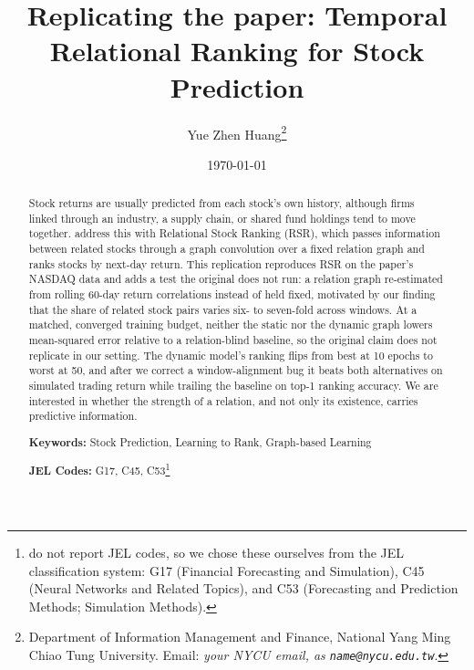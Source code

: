\documentclass[12pt]{article}
\newcommand{\inst}[1]{\textit{#1}}
\begin{document}
\begin{titlepage}

\title{Replicating the paper:
       Temporal Relational Ranking for Stock Prediction \citep{feng2019temporal}}

\author{Yue Zhen Huang\thanks{Department of Information Management and Finance,
        National Yang Ming Chiao Tung University. Email:
        \inst{your NYCU email, as \texttt{name@nycu.edu.tw}}.}}

\date{\today}
\maketitle

\begin{abstract}
\noindent
Stock returns are usually predicted from each stock's own history, although firms linked
through an industry, a supply chain, or shared fund holdings tend to move together.
\citet{feng2019temporal} address this with Relational Stock Ranking (RSR), which passes
information between related stocks through a graph convolution over a fixed relation graph and
ranks stocks by next-day return. This replication reproduces RSR on the paper's NASDAQ data and
adds a test the original does not run: a relation graph re-estimated from rolling 60-day return
correlations instead of held fixed, motivated by our finding that the share of related stock
pairs varies six- to seven-fold across windows. At a matched, converged training budget, neither
the static nor the dynamic graph lowers mean-squared error relative to a relation-blind baseline,
so the original claim does not replicate in our setting. The dynamic model's ranking flips from
best at 10 epochs to worst at 50, and after we correct a window-alignment bug it beats both
alternatives on simulated trading return while trailing the baseline on top-1 ranking accuracy.
We are interested in whether the strength of a relation, and not only its existence, carries
predictive information.

\vspace{0in}
\noindent\textbf{Keywords:} Stock Prediction, Learning to Rank, Graph-based Learning

\vspace{0in}
\noindent\textbf{JEL Codes:} G17, C45, C53\footnote{\citet{feng2019temporal} do not report JEL
codes, so we chose these ourselves from the JEL classification system: G17 (Financial
Forecasting and Simulation), C45 (Neural Networks and Related Topics), and C53 (Forecasting and
Prediction Methods; Simulation Methods).}

\bigskip
\end{abstract}

\setcounter{page}{0}
\thispagestyle{empty}
\end{titlepage}
\pagebreak
\end{document}
